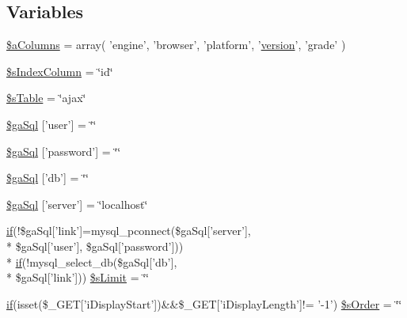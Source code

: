 \subsection*{Variables}
\begin{DoxyCompactItemize}
\item 
\hyperlink{custom__data__property_8php_aba12f5ba193beb8beb9fdd0a758711e8}{\$a\+Columns} = array( 'engine', 'browser', 'platform', '\hyperlink{jquery-ui_8js_a8fa514f3aed7ddc8bfb00ed5aea5b5e2}{version}', 'grade' )
\item 
\hyperlink{custom__data__property_8php_a8bddf0b8ded9777b9068de5fa9e217a2}{\$s\+Index\+Column} = \char`\"{}id\char`\"{}
\item 
\hyperlink{custom__data__property_8php_a6b7d3b9c752a0c977de5ddae78b522a9}{\$s\+Table} = \char`\"{}ajax\char`\"{}
\item 
\hyperlink{custom__data__property_8php_a08fc9fba5bf358871d1f80066f8930d1}{\$ga\+Sql} \mbox{[}'user'\mbox{]} = \char`\"{}\char`\"{}
\item 
\hyperlink{custom__data__property_8php_a5a7f7a53d25bfc58a76a0132750c80eb}{\$ga\+Sql} \mbox{[}'password'\mbox{]} = \char`\"{}\char`\"{}
\item 
\hyperlink{custom__data__property_8php_aaa5ffcba6d18eacf65c42024605b6486}{\$ga\+Sql} \mbox{[}'db'\mbox{]} = \char`\"{}\char`\"{}
\item 
\hyperlink{custom__data__property_8php_a23a651ce4e9cd3741cb88709c0bfdf8e}{\$ga\+Sql} \mbox{[}'server'\mbox{]} = \char`\"{}localhost\char`\"{}
\item 
\hyperlink{fullpage_2plugin_8js_a8b98017e64ef036adb9ae327ff94abe1}{if}(!\$ga\+Sql\mbox{[}'link'\mbox{]}=mysql\+\_\+pconnect(\$ga\+Sql\mbox{[}'server'\mbox{]}, \\*
\$ga\+Sql\mbox{[}'user'\mbox{]}, \$ga\+Sql\mbox{[}'password'\mbox{]})) \\*
\hyperlink{fullpage_2plugin_8js_a8b98017e64ef036adb9ae327ff94abe1}{if}(!mysql\+\_\+select\+\_\+db(\$ga\+Sql\mbox{[}'db'\mbox{]}, \\*
\$ga\+Sql\mbox{[}'link'\mbox{]})) \hyperlink{custom__data__property_8php_a867f070c3b4e597275c622aac60de587}{\$s\+Limit} = \char`\"{}\char`\"{}
\item 
\hyperlink{fullpage_2plugin_8js_a8b98017e64ef036adb9ae327ff94abe1}{if}(isset(\$\+\_\+\+G\+E\+T\mbox{[}'i\+Display\+Start'\mbox{]})\&\&\$\+\_\+\+G\+E\+T\mbox{[}'i\+Display\+Length'\mbox{]}!= '-\/1') \hyperlink{custom__data__property_8php_a4943002271f61f76fd87176bc8b923bf}{\$s\+Order} = \char`\"{}\char`\"{}
\item 

\end{DoxyCompactItemize}
